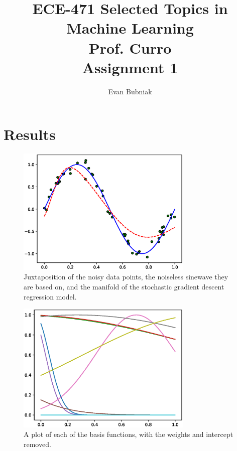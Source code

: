 \documentclass[12pt]{article}
\title{%
	ECE-471 Selected Topics in Machine Learning \\
	Prof. Curro \\
	Assignment 1}
\author{Evan Bubniak}
\begin{document}
\maketitle

\section{Results}

\begin{figure}[H]
	\centering
	\includegraphics[width=0.75\textwidth]{prediction.eps}
	\caption{Juxtaposition of the noisy data points, the noiseless sinewave they are based on, and the manifold of the stochastic gradient descent regression model.}
\end{figure}

\begin{figure}[H]
	\centering
	\includegraphics[width=0.75\textwidth]{bases.eps}
	\caption{A plot of each of the basis functions, with the weights and intercept removed.}
\end{figure}
\end{document}
